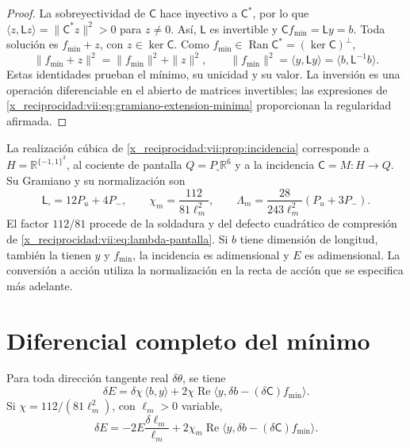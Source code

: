 \begin{proof}
La sobreyectividad de \(\mathsf C\) hace inyectivo a \(\mathsf C^*\),
por lo que \(\langle z,\mathsf Lz\rangle=\|\mathsf C^*z\|^2>0\)
para \(z\ne0\). Así, \(\mathsf L\) es invertible y
\(\mathsf C f_{\min}=\mathsf L y=b\). Toda solución es
\(f_{\min}+z\), con \(z\in\ker\mathsf C\). Como
\(f_{\min}\in\operatorname{Ran}\mathsf C^*=(\ker\mathsf C)^\perp\),
\[
 \|f_{\min}+z\|^2=\|f_{\min}\|^2+\|z\|^2,
 \qquad
 \|f_{\min}\|^2=\langle y,\mathsf L y\rangle
 =\langle b,\mathsf L^{-1}b\rangle.
\]
Estas identidades prueban el mínimo, su unicidad y su valor. La inversión
es una operación diferenciable en el abierto de matrices invertibles;
las expresiones de \eqref{x_reciprocidad:vii:eq:gramiano-extension-minima} proporcionan
la regularidad afirmada.
\end{proof}

La realización cúbica de \ref{x_reciprocidad:vii:prop:incidencia} corresponde a
\(H=\mathbb R^{\{-1,1\}^3}\), al cociente de pantalla
\(Q=P_\square\mathbb R^6\) y a la incidencia \(\mathsf C=M:H\to Q\).
Su Gramiano y su normalización son
\begin{equation}
 \mathsf L_\square=12P_u+4P_-,\qquad
 \chi_m=\frac{112}{81\ell_m^2},\qquad
 \Lambda_m=\frac{28}{243\ell_m^2}(P_u+3P_-).
 \label{x_reciprocidad:vii:eq:normalizacion-minimo-cubico}
\end{equation}
El factor \(112/81\) procede de la soldadura y del defecto cuadrático
de compresión de \eqref{x_reciprocidad:vii:eq:lambda-pantalla}. Si \(b\) tiene dimensión
de longitud, también la tienen \(y\) y \(f_{\min}\), la incidencia es
adimensional y \(E\) es adimensional. La conversión a acción utiliza
la normalización en la recta de acción que se especifica más adelante.

\section{Diferencial completo del mínimo}
\label{x_reciprocidad:vii:subsec:diferencial-minimo}

\begin{theorem}
\label{x_reciprocidad:vii:thm:diferencial-minimo}
Para toda dirección tangente real \(\delta\theta\), se tiene
\begin{equation}
 \delta E
 =\delta\chi\,\langle b,y\rangle
   +2\chi\operatorname{Re}
       \langle y,\delta b-(\delta\mathsf C)f_{\min}\rangle.
 \label{x_reciprocidad:vii:eq:diferencial-minimo-completo}
\end{equation}
Si \(\chi=112/(81\ell_m^2)\), con \(\ell_m>0\) variable,
\begin{equation}
 \delta E=-2E\frac{\delta\ell_m}{\ell_m}
 +2\chi_m\operatorname{Re}
       \langle y,\delta b-(\delta\mathsf C)f_{\min}\rangle.
 \label{x_reciprocidad:vii:eq:diferencial-minimo-escala}
\end{equation}
\end{theorem}

